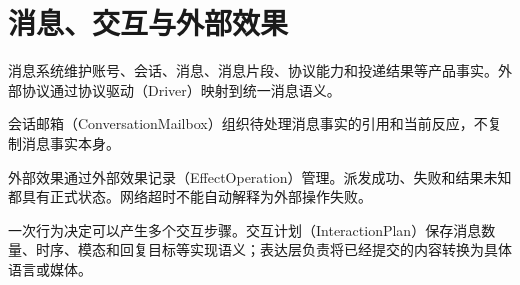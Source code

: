 \chapter{消息、交互与外部效果}

消息系统维护账号、会话、消息、消息片段、协议能力和投递结果等产品事实。外部协议通过协议驱动（Driver）映射到统一消息语义。

会话邮箱（ConversationMailbox）组织待处理消息事实的引用和当前反应，不复制消息事实本身。

外部效果通过外部效果记录（EffectOperation）管理。派发成功、失败和结果未知都具有正式状态。网络超时不能自动解释为外部操作失败。

一次行为决定可以产生多个交互步骤。交互计划（InteractionPlan）保存消息数量、时序、模态和回复目标等实现语义；表达层负责将已经提交的内容转换为具体语言或媒体。
